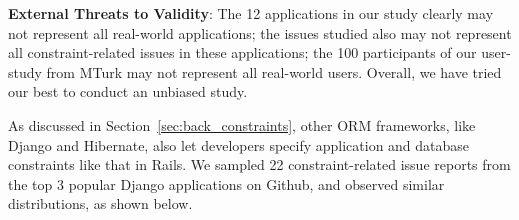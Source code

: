 \textbf{External Threats to Validity}:
The 12 applications in our study clearly may not represent all real-world applications;
the \numissues issues studied also may not represent all constraint-related issues in these applications;
the 100 participants of our user-study from MTurk may not represent all real-world users. Overall, we have tried our best to conduct an unbiased study.

As discussed in Section~\ref{sec:back_constraints}, other ORM frameworks, like
Django and Hibernate, also let developers specify application and database constraints  like that in Rails.
We sampled 22 constraint-related issue reports from the top 3 popular Django applications on Github, and observed similar
distributions, as shown below. 
\begin{table}[h]
\label{django-issue}
\end{table}


